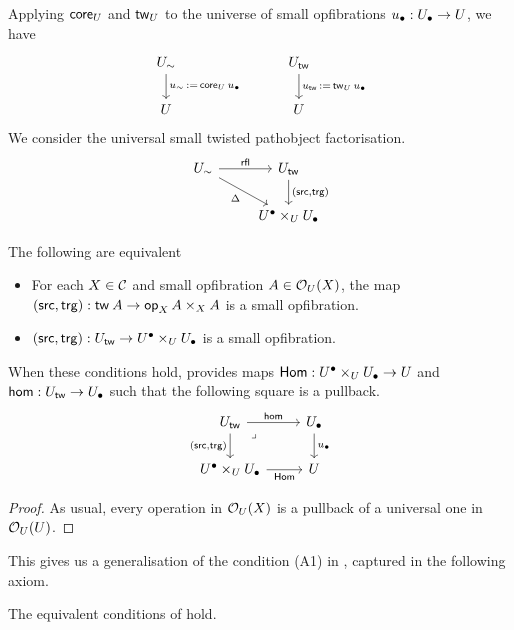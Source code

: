 Applying $\vCore[U]{}$ and $\vTw[U]{}$ to the universe of small opfibrations
$\ulow : \Ulow \to \U$, we have
\[ \begin{tikzcd}
	\Usim &&& \Utw \\
	\U &&& \U
	\arrow["{\usim \, := \, \vCore[U]{\ulow}}", from=1-1, to=2-1]
	\arrow["{\utw \, := \, \vTw[U]{\ulow}}", from=1-4, to=2-4]
\end{tikzcd} \]
We consider the universal small twisted pathobject factorisation.
\[\begin{tikzcd}
	\Usim & \Utw \\
	& {\Uupp \times_\U \Ulow}
	\arrow["\rfl", from=1-1, to=1-2]
	\arrow["\Delta"', from=1-1, to=2-2]
	\arrow["{{(\src,\trg)}}", from=1-2, to=2-2]
\end{tikzcd}\]

\begin{proposition}\label{prop:src-trg-small-opfibration}
  The following are equivalent
  \begin{itemize}
    \item For each $X \in \CC$ and small opfibration $A \in \opfibcart_\U(X)$,
      the map $(\src,\trg) : \vTw{A} \to \vOp[X]{A} \times_X A$
      is a small opfibration.
    \item $(\src,\trg) : \Utw \to \Uupp \times_\U \Ulow$
      is a small opfibration.
  \end{itemize}
  When these conditions hold,
   provides maps
  $\Dir : \Uupp \times_\U \Ulow \to \U$
  and $\dir : \Utw \to \Ulow$ such that
  the following square is a pullback.
  \[
    \begin{tikzcd}
      \Utw & \Ulow \\
      {\Uupp \times_\U \Ulow} & \U
      \arrow["\dir", from=1-1, to=1-2]
      \arrow["{(\src, \trg)}"', from=1-1, to=2-1]
      \arrow["\ulow", from=1-2, to=2-2]
      \arrow["\Dir"', from=2-1, to=2-2]
      \arrow["\lrcorner"{anchor=center, pos=0.125}, draw=none, from=1-1, to=2-2]
    \end{tikzcd}
  \]
\end{proposition}
\begin{proof}
  As usual, every operation in $\opfibcart_\U(X)$
  is a pullback of a universal one in $\opfibcart_\U(\U)$.
\end{proof}

This gives us a generalisation of the condition (A1) in \cite{awodey2026},
captured in the following axiom.
\begin{axiom}\label{ax:hom-formation-introduction}
  The equivalent conditions of
   hold.
\end{axiom}

